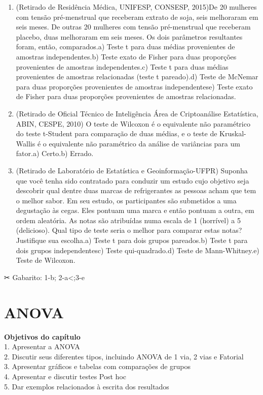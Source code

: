 \documentclass[
]{book}
\begin{document}
\begin{question}

\begin{enumerate}
\def\labelenumi{\arabic{enumi}.}
\item
  (Retirado de Residência Médica, UNIFESP, CONSESP, 2015)De 20 mulheres com tensão pré-menstrual que receberam extrato de soja, seis melhoraram em seis meses. De outras 20 mulheres com tensão pré-menstrual que receberam placebo, duas melhoraram em seis meses. Os dois parâmetros resultantes foram, então, comparados.a) Teste t para duas médias provenientes de amostras independentes.b) Teste exato de Fisher para duas proporções provenientes de amostras independentes.c) Teste t para duas médias provenientes de amostras relacionadas (teste t pareado).d) Teste de McNemar para duas proporções provenientes de amostras independentese) Teste exato de Fisher para duas proporções provenientes de amostras relacionadas.
\item
  (Retirado de Oficial Técnico de Inteligência Área de Criptoanálise Estatística, ABIN, CESPE, 2010) O teste de Wilcoxon é o equivalente não paramétrico do teste t-Student para comparação de duas médias, e o teste de Kruskal-Wallis é o equivalente não paramétrico da análise de variâncias para um fator.a) Certo.b) Errado.
\item
  (Retirado de Laboratório de Estatística e Geoinformação-UFPR) Suponha que você tenha sido contratado para conduzir um estudo cujo objetivo seja descobrir qual dentre duas marcas de refrigerantes as pessoas acham que tem o melhor sabor. Em seu estudo, os participantes são submetidos a uma degustação às cegas. Eles pontuam uma marca e então pontuam a outra, em ordem aleatória. As notas são atribuídas numa escala de 1 (horrível) a 5 (delicioso). Qual tipo de teste seria o melhor para comparar estas notas? Justifique sua escolha.a) Teste t para dois grupos pareados.b) Teste t para dois grupos independentesc) Teste qui-quadrado.d) Teste de Mann-Whitney.e) Teste de Wilcoxon.
\end{enumerate}

\end{question}

✂ Gabarito: 1-b; 2-a\textless;3-e

\hypertarget{anova}{%
\chapter{ANOVA}\label{anova}}

\begin{objectives}
\textbf{Objetivos do capítulo}\\
1. Apresentar a ANOVA\\
2. Discutir seus diferentes tipos, incluindo ANOVA de 1 via, 2 vias e
Fatorial\\
3. Apresentar gráficos e tabelas com comparações de grupos\\
4. Apresentar e discutir testes Post hoc\\
5. Dar exemplos relacionados à escrita dos resultados
\end{objectives}
\end{document}

